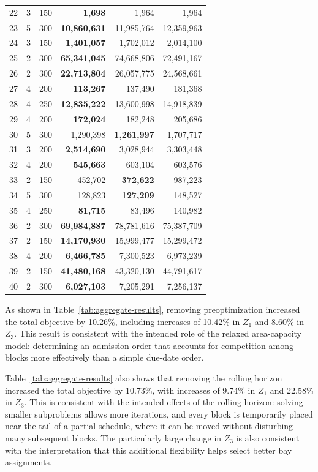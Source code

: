 \documentclass[runningheads]{llncs}
\begin{document}
\begin{table}[t]
\begin{tabular}{rrrrrr}
    22 & 3 & 150 & \textbf{1,698} & 1,964 & 1,964 \\
    23 & 5 & 300 & \textbf{10,860,631} & 11,985,764 & 12,359,963 \\
    24 & 3 & 150 & \textbf{1,401,057} & 1,702,012 & 2,014,100 \\
    25 & 2 & 300 & \textbf{65,341,045} & 74,668,806 & 72,491,167 \\
    26 & 2 & 300 & \textbf{22,713,804} & 26,057,775 & 24,568,661 \\
    27 & 4 & 200 & \textbf{113,267} & 137,490 & 181,368 \\
    28 & 4 & 250 & \textbf{12,835,222} & 13,600,998 & 14,918,839 \\
    29 & 4 & 200 & \textbf{172,024} & 182,248 & 205,686 \\
    30 & 5 & 300 & 1,290,398 & \textbf{1,261,997} & 1,707,717 \\
    31 & 3 & 200 & \textbf{2,514,690} & 3,028,944 & 3,303,448 \\
    32 & 4 & 200 & \textbf{545,663} & 603,104 & 603,576 \\
    33 & 2 & 150 & 452,702 & \textbf{372,622} & 987,223 \\
    34 & 5 & 300 & 128,823 & \textbf{127,209} & 148,527 \\
    35 & 4 & 250 & \textbf{81,715} & 83,496 & 140,982 \\
    36 & 2 & 300 & \textbf{69,984,887} & 78,781,616 & 75,387,709 \\
    37 & 2 & 150 & \textbf{14,170,930} & 15,999,477 & 15,299,472 \\
    38 & 4 & 200 & \textbf{6,466,785} & 7,300,523 & 6,973,239 \\
    39 & 2 & 150 & \textbf{41,480,168} & 43,320,130 & 44,791,617 \\
    40 & 2 & 300 & \textbf{6,027,103} & 7,205,291 & 7,256,137 \\
    \hline
  \end{tabular}
\end{table}

As shown in Table~\ref{tab:aggregate-results}, removing preoptimization
increased the total objective by 10.26\%, including
increases of 10.42\% in $Z_1$ and 8.60\% in $Z_3$. This result is consistent
with the intended role of the relaxed area-capacity model: determining an
admission order that accounts for competition among blocks more effectively
than a simple due-date order.

Table~\ref{tab:aggregate-results} also shows that removing the rolling horizon
increased the total objective by 10.73\%, with
increases of 9.74\% in $Z_1$ and 22.58\% in $Z_3$.  This is consistent with
the intended effects of the rolling horizon: solving smaller subproblems
allows more iterations, and every block is temporarily placed near the tail
of a partial schedule, where it can be moved without disturbing many
subsequent blocks.  The particularly large change in $Z_3$ is also consistent
with the interpretation that this additional flexibility helps select better
bay assignments.
\end{document}
